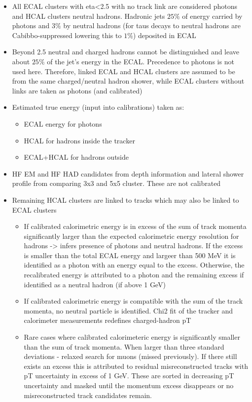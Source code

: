 \begin{itemize}
    \item All ECAL clusters with eta<2.5 with no track link are considered photons and HCAL clusters neutral hadrons. Hadronic jets $25\%$ of energy carried by photons and $3\%$ by neutral hadrons (for taus decays to neutral hadrons are Cabibbo-suppressed lowering this to $1\%$) deposited in ECAL
    \item Beyond 2.5 neutral and charged hadrons cannot be distinguished and leave about $25\%$ of the jet's energy in the ECAL. Precedence to photons is not used here. Therefore, linked ECAL and HCAL clusters are assumed to be from the same charged/neutral hadron shower, while ECAL clusters without links are taken as photons (and calibrated)
    \item Estimated true energy (input into calibrations) taken as:
    \begin{itemize}
        \item ECAL energy for photons
        \item HCAL for hadrons inside the tracker
        \item ECAL+HCAL for hadrons outside
    \end{itemize}
    \item HF EM and HF HAD candidates from depth information and lateral shower profile from comparing 3x3 and 5x5 cluster. These are not calibrated
\end{itemize}

\begin{itemize}
    \item Remaining HCAL clusters are linked to tracks which may also be linked to ECAL clusters
    \begin{itemize}
        \item If calibrated calorimetric energy is in excess of the sum of track momenta significantly larger than the expected calorimetric energy resolution for hadrons -> infers presence of photons and neutral hadrons. If the excess is smaller than the total ECAL energy and largeer than 500 MeV it is identified as a photon with an energy equal to the excess. Otherwise, the recalibrated energy is attributed to a photon and the remaining excess if identified as a neutral hadron (if above 1 GeV)
        \item If calibrated calorimetric energy is compatible with the sum of the track momenta, no neutral particle is identified. Chi2 fit of the tracker and calorimeter measurements redefines charged-hadron pT
        \item Rare cases where calibrated calorimeteric energy is significantly smaller than the sum of track momenta. When larger than three standard deviations - relaxed search for muons (missed previously). If there still exists an excess this is attributed to residual misreconstructed tracks with pT uncertainty in excess of 1 GeV. These are sorted in decreasing pT uncertainty and masked until the momentum excess disappears or no misreconstructed track candidates remain. 
    \end{itemize}
\end{itemize}
    
